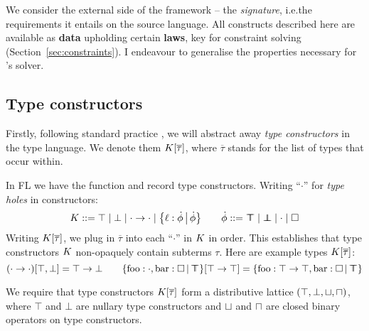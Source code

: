 We consider the external side of the \inference{} framework -- the \emph{signature}, i.e.\@ the requirements it entails on the source language. 
All constructs described here are available as \textbf{data} upholding certain \textbf{laws}, key for constraint solving  (Section~\ref{sec:constraints}). I endeavour to generalise the properties necessary for \mlstruct{}'s solver.

\subsection{Type constructors}

Firstly, following standard practice \cite{essence-of-ml-type-inference, constraint-based-freeze-ml}, we will abstract away \emph{type constructors} in the type language. We denote them $K[\overline \tau]$, where $\overline \tau$ stands for the list of types that occur within.
\begin{example}
    In FL we have the function and record type constructors. Writing \enquote{$\cdot$} for \emph{type holes} in constructors:
    $$
       \constr ::= \top \mid \bot \mid {\cdot} \to {\cdot} \mid \flext{\ell : \dot \phi}{\dot \phi} \qquad \dot \phi ::= \flftop \mid \flfbot \mid \cdot \mid \flabsent
    $$
    Writing $K[\overline \tau]$, we plug in $\overline \tau$ into each \enquote{$\cdot$} in $K$ in order. This establishes that type constructors $K$ non-opaquely contain subterms $\tau$. Here are example types $K[\overline \tau]$:
    $$
        (\cdot \to \cdot)[\top, \bot] = \top \to \bot \qquad \flext{\mathrm{foo}: \cdot, \mathrm{bar} : \flabsent}{\flftop}[\top \to \top] = \flext{\mathrm{foo}: \top \to \top, \mathrm{bar} : \flabsent}{\flftop}
    $$
\end{example}

We require that type constructors $K[\overline \tau]$ form a distributive lattice $(\top, \bot, \sqcup, \sqcap)$, where $\top$ and $\bot$ are nullary type constructors and $\sqcup$ and $\sqcap$ are closed binary operators on type constructors. 

